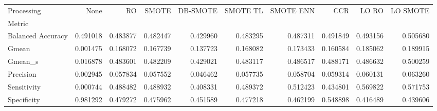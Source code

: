 \begin{tabular}{lrrrrrrrrr}
\toprule
Processing &      None &        RO &     SMOTE &  DB-SMOTE &  SMOTE TL &  SMOTE ENN &       CCR &     LO RO &  LO SMOTE \\
Metric            &           &           &           &           &           &            &           &           &           \\
\midrule
Balanced Accuracy &  0.491018 &  0.483877 &  0.482447 &  0.429960 &  0.483295 &   0.487311 &  0.491849 &  0.493156 &  0.505680 \\
Gmean             &  0.001475 &  0.168072 &  0.167739 &  0.137723 &  0.168082 &   0.173433 &  0.160584 &  0.185062 &  0.189915 \\
Gmean_s           &  0.016878 &  0.483601 &  0.482209 &  0.429021 &  0.483117 &   0.486517 &  0.488171 &  0.486632 &  0.500259 \\
Precision         &  0.002945 &  0.057834 &  0.057552 &  0.046462 &  0.057735 &   0.058704 &  0.059314 &  0.060131 &  0.063260 \\
Sensitivity       &  0.000744 &  0.488482 &  0.488932 &  0.408331 &  0.489372 &   0.512423 &  0.434801 &  0.569822 &  0.571753 \\
Specificity       &  0.981292 &  0.479272 &  0.475962 &  0.451589 &  0.477218 &   0.462199 &  0.548898 &  0.416489 &  0.439606 \\
\bottomrule
\end{tabular}
